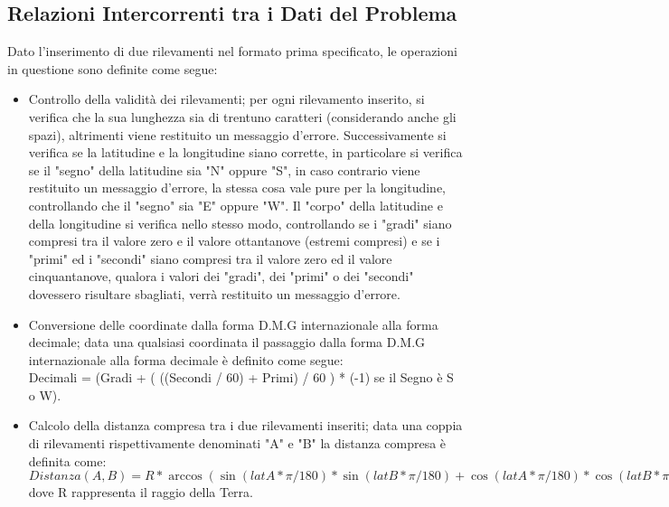 \documentclass{article}
\begin{document}
\subsection{Relazioni Intercorrenti tra i Dati del Problema}
Dato l'inserimento di due rilevamenti nel formato prima specificato, le operazioni in questione sono definite come segue:
\begin{itemize}
	\item Controllo della validità dei rilevamenti; per ogni rilevamento inserito, si verifica che la sua lunghezza sia di trentuno caratteri (considerando anche gli spazi), altrimenti viene restituito un messaggio d'errore. Successivamente si verifica se la latitudine e la longitudine siano corrette, in particolare si verifica se il "segno" della latitudine sia "N" oppure "S", in caso contrario viene restituito un messaggio d'errore, la stessa cosa vale pure per la longitudine, controllando che il "segno" sia "E" oppure "W". Il "corpo" della latitudine e della longitudine si verifica nello stesso modo, controllando se i "gradi" siano compresi tra il valore zero e il valore ottantanove (estremi compresi) e se i "primi" ed i "secondi" siano compresi tra il valore zero ed il valore cinquantanove, qualora i valori dei "gradi", dei "primi" o dei "secondi" dovessero risultare sbagliati, verrà restituito un messaggio d'errore.
	
	\item Conversione delle coordinate dalla forma D.M.G internazionale alla forma decimale; data una qualsiasi coordinata il passaggio dalla forma D.M.G internazionale alla forma decimale è definito come segue: \\
	Decimali = (Gradi + ( ((Secondi / 60) + Primi) / 60 ) * (-1) se il Segno è  S o W).
	
	\item Calcolo della distanza compresa tra i due rilevamenti inseriti;  data una coppia di rilevamenti rispettivamente denominati "A" e "B" la distanza compresa è definita come: \\
	$Distanza(A, B) = R * \arccos(\sin(latA * \pi / 180) * \sin(latB * \pi / 180) + \cos(latA * \pi / 180) * \cos(latB * \pi / 180) * \cos((lonA - lonB) * \pi / 180)). $\\
	dove R rappresenta il raggio della Terra.
	

\end{itemize}
\end{document}
